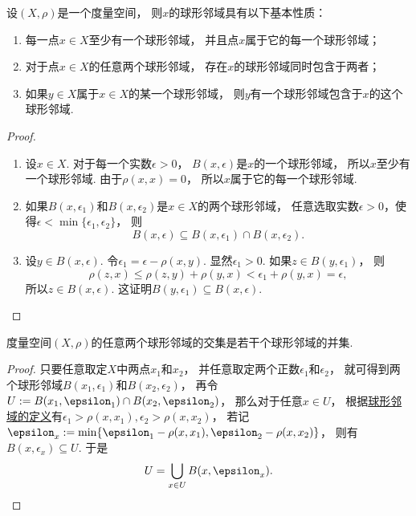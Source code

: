 \begin{theorem}\label{theorem:度量空间.球形邻域的性质}
设\((X,\rho)\)是一个度量空间，
则\(x\)的球形邻域具有以下基本性质：
\begin{enumerate}
	\item 每一点\(x \in X\)至少有一个球形邻域，
	并且点\(x\)属于它的每一个球形邻域；

	\item 对于点\(x \in X\)的任意两个球形邻域，
	存在\(x\)的球形邻域同时包含于两者；

	\item 如果\(y \in X\)属于\(x \in X\)的某一个球形邻域，
	则\(y\)有一个球形邻域包含于\(x\)的这个球形邻域.
\end{enumerate}
\begin{proof}
\begin{enumerate}
	\item 设\(x \in X\).
	对于每一个实数\(\epsilon>0\)，
	\(B(x,\epsilon)\)是\(x\)的一个球形邻域，
	所以\(x\)至少有一个球形邻域.
	由于\(\rho(x,x)=0\)，
	所以\(x\)属于它的每一个球形邻域.

	\item 如果\(B(x,\epsilon_1)\)和\(B(x,\epsilon_2)\)是\(x \in X\)的两个球形邻域，
	任意选取实数\(\epsilon>0\)，使得\(\epsilon<\min\{\epsilon_1,\epsilon_2\}\)，
	则\begin{equation*}
		B(x,\epsilon)
		\subseteq
		B(x,\epsilon_1) \cap B(x,\epsilon_2).
	\end{equation*}

	\item 设\(y \in B(x,\epsilon)\).
	令\(\epsilon_1 = \epsilon - \rho(x,y)\).
	显然\(\epsilon_1>0\).
	如果\(z \in B(y,\epsilon_1)\)，
	则\begin{equation*}
		\rho(z,x)
		\leq \rho(z,y) + \rho(y,x)
		< \epsilon_1 + \rho(y,x)
		= \epsilon,
	\end{equation*}
	所以\(z \in B(x,\epsilon)\).
	这证明\(B(y,\epsilon_1) \subseteq B(x,\epsilon)\).
	\qedhere
\end{enumerate}
\end{proof}
\end{theorem}

\begin{theorem}
度量空间\((X,\rho)\)的任意两个球形邻域的交集是若干个球形邻域的并集.
\begin{proof}
只要任意取定\(X\)中两点\(x_1\)和\(x_2\)，
并任意取定两个正数\(\epsilon_1\)和\(\epsilon_2\)，
就可得到两个球形邻域\(B(x_1,\epsilon_1)\)和\(B(x_2,\epsilon_2)\)，
再令\(U \defeq B(x_1,\epsilon_1) \cap B(x_2,\epsilon_2)\)，
那么对于任意\(x \in U\)，
根据\hyperref[definition:度量空间.球形邻域的概念]{球形邻域的定义}有\(
	\epsilon_1 > \rho(x,x_1),
	\epsilon_2 > \rho(x,x_2)
\)，
若记\(
	\epsilon_x \defeq \min\{
		\epsilon_1 - \rho(x,x_1),
		\epsilon_2 - \rho(x,x_2)
	\}
\)，
则有\(B(x,\epsilon_x) \subseteq U\).
于是\begin{equation*}
	U = \bigcup_{x \in U} B(x,\epsilon_x).
	\qedhere
\end{equation*}
\end{proof}
\end{theorem}


